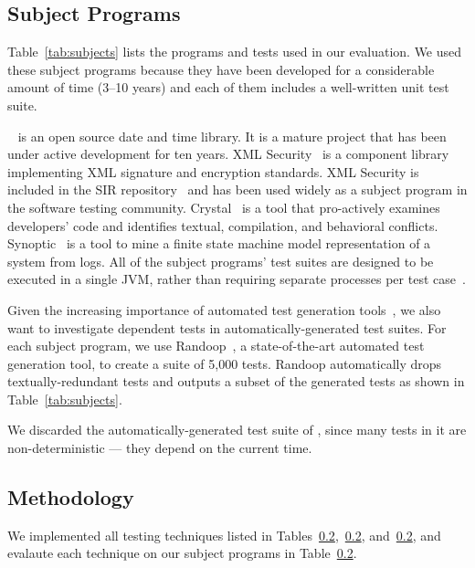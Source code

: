 \subsection{Subject Programs}

Table~\ref{tab:subjects} lists the programs and
tests used in our evaluation. We used these subject
programs because they have been developed for
a considerable amount of time (3--10 years) and each
of them includes a well-written unit test suite.

\jt~\cite{jodatime} is an open source
date and time library. It is a mature project that
has been under active development
for ten years. XML Security~\cite{xmlsecurity}
is a component library implementing XML signature and encryption
standards. XML Security is included in
the SIR repository~\cite{sir} and has been used widely
as a subject program in the software testing community.
Crystal~\cite{crystal} is a tool that
pro-actively examines developers' code and
identifies textual, compilation, and behavioral conflicts.
Synoptic~\cite{synoptic} is a tool to mine a finite state
machine model representation of a system from logs.
All of the subject programs' test suites are designed to be executed in
a single JVM, rather than requiring separate processes per test case~\cite{vmvm}.

Given the increasing importance of automated test generation
tools~\cite{PachecoLET2007, ZhangSBE2011, Csallner:2004, fraseretal:ISSTA:2011},
we also want to investigate dependent tests in automatically-generated
test suites. For each subject program, we use
Randoop~\cite{PachecoLET2007}, a state-of-the-art automated
test generation tool, to create a suite of 5,000 tests.
Randoop automatically drops textually-redundant tests 
and outputs a subset of the generated tests as
shown in Table~\ref{tab:subjects}.

We discarded the automatically-generated test suite of
\jt, since many tests in it are non-deterministic ---
they depend on the current time.


\subsection{Methodology}

We implemented all testing techniques listed
in Tables~\ref{},~\ref{}, and~\ref{}, and evalaute
each technique on our subject programs in
Table~\ref{}.


